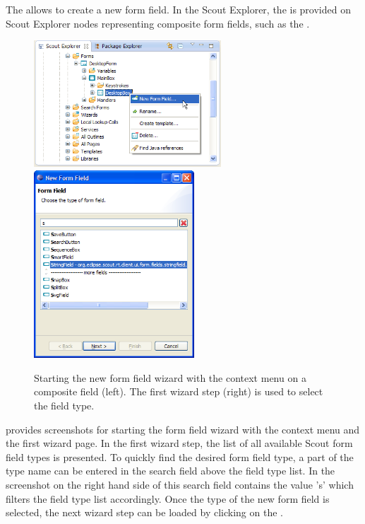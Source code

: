 \documentclass[a4paper,10pt,twoside]{book}
\begin{document}
The  allows to create a new form field. 
In the Scout Explorer, the  is provided on Scout Explorer nodes representing composite form fields, such as the . 

\begin{figure}
\includegraphics[width=7cm]{wizard_field_contextmenu.png} \hspace{5mm}
\includegraphics[width=6cm]{wizard_field_1.png}
\caption{Starting the new form field wizard with the context menu on a composite field (left). The first wizard step (right) is used to select the field type.}
\end{figure}

 provides screenshots for starting the form field wizard with the context menu and the first wizard page. 
In the first wizard step, the list of all available Scout form field types is presented. 
To quickly find the desired form field type, a part of the type name can be entered in the search field above the field type list. 
In the screenshot on the right hand side of  this search field contains the value 's' which filters the field type list accordingly. 
Once the type of the new form field is selected, the next wizard step can be loaded by clicking on the .
\end{document}
